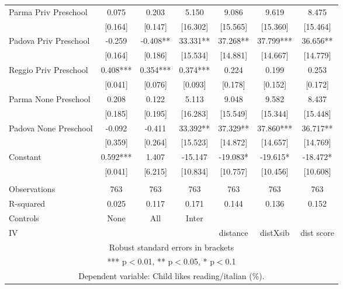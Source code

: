 \begin{tabular}{lcccccc}
Parma Priv Preschool & 0.075 & 0.203 & 5.150 & 9.086 & 9.619 & 8.475 \\
 & [0.164] & [0.147] & [16.302] & [15.565] & [15.360] & [15.464] \\
Padova Priv Preschool & -0.259 & -0.408** & 33.331** & 37.268** & 37.799*** & 36.656** \\
 & [0.164] & [0.186] & [15.534] & [14.881] & [14.667] & [14.779] \\
Reggio Priv Preschool & 0.408*** & 0.354*** & 0.374*** & 0.224 & 0.199 & 0.253 \\
 & [0.041] & [0.076] & [0.093] & [0.178] & [0.152] & [0.172] \\
Parma None Preschool & 0.208 & 0.122 & 5.113 & 9.048 & 9.582 & 8.437 \\
 & [0.185] & [0.195] & [16.283] & [15.549] & [15.344] & [15.448] \\
Padova None Preschool & -0.092 & -0.411 & 33.392** & 37.329** & 37.860*** & 36.717** \\
 & [0.359] & [0.264] & [15.523] & [14.872] & [14.657] & [14.769] \\
Constant & 0.592*** & 1.407 & -15.147 & -19.083* & -19.615* & -18.472* \\
 & [0.041] & [6.215] & [10.834] & [10.757] & [10.456] & [10.608] \\
 &  &  &  &  &  &  \\
Observations & 763 & 763 & 763 & 763 & 763 & 763 \\
R-squared & 0.025 & 0.117 & 0.171 & 0.144 & 0.136 & 0.152 \\
Controls & None & All & Inter &  &  &  \\
 IV &  &  &  & distance & distXsib & dist score \\ \hline
\multicolumn{7}{c}{ Robust standard errors in brackets} \\
\multicolumn{7}{c}{ *** p$<$0.01, ** p$<$0.05, * p$<$0.1} \\
\multicolumn{7}{c}{ Dependent variable: Child likes reading/italian (\%).} \\
\end{tabular}

